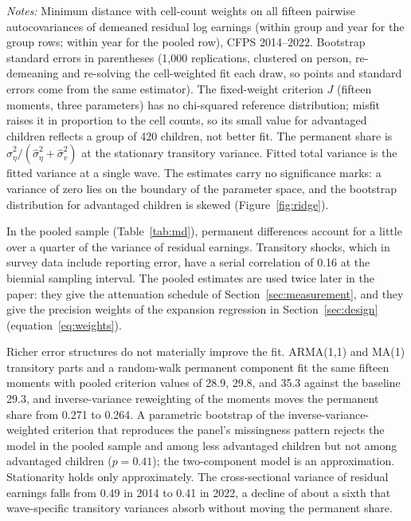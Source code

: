 \documentclass[11pt]{article}
\begin{document}
\begin{table}[t]
\centering
\small
\caption{Permanent--transitory decomposition of residual log earnings.}
\label{tab:md}

\par\smallskip
\begin{minipage}{0.92\textwidth}
\footnotesize\emph{Notes:} Minimum distance with cell-count weights on
all fifteen pairwise autocovariances of demeaned residual log earnings
(within group and year for the group rows; within year for the
pooled row), CFPS 2014--2022. Bootstrap standard errors in
parentheses (1,000 replications, clustered on person, re-demeaning and
re-solving the cell-weighted fit each draw, so points and standard
errors come from the same estimator). The fixed-weight criterion $J$ (fifteen moments, three parameters) has no chi-squared reference distribution; misfit raises it in proportion to the cell counts, so its small value for advantaged children reflects a group of 420 children, not better fit. The permanent share is
$\hat\sigma^2_\eta / (\hat\sigma^2_\eta + \hat\sigma^2_v)$ at the
stationary transitory variance. Fitted total variance is the fitted
variance at a single wave.
The estimates carry no significance marks: a variance of zero lies on the boundary of the parameter space, and the bootstrap distribution for advantaged children is skewed (Figure~\ref{fig:ridge}).
\end{minipage}
\end{table}

In the pooled sample (Table~\ref{tab:md}), permanent
differences account for a little over a quarter of the variance of residual earnings. Transitory shocks, which in survey data include reporting error, have a serial correlation of 0.16 at the biennial
sampling interval. The pooled estimates are used twice later in the paper: they give the attenuation schedule of Section~\ref{sec:measurement}, and they give the precision weights of the expansion regression in Section~\ref{sec:design} (equation~\eqref{eq:weights}).

Richer error structures do not materially improve the fit. ARMA(1,1) and MA(1)
transitory parts and a random-walk permanent component fit the same
fifteen moments with pooled criterion values of 28.9, 29.8, and 35.3 against the baseline 29.3, and inverse-variance reweighting of the moments moves the permanent share from 0.271 to 0.264. A parametric
bootstrap of the inverse-variance-weighted criterion that reproduces the panel's missingness pattern rejects the model in the pooled sample and among less advantaged children but not among advantaged children ($p = 0.41$); the two-component model is an approximation. Stationarity holds only approximately. The cross-sectional
variance of residual earnings falls from 0.49 in 2014 to 0.41 in 2022, a decline of about a sixth
that wave-specific transitory variances absorb without moving the
permanent share.
\end{document}
